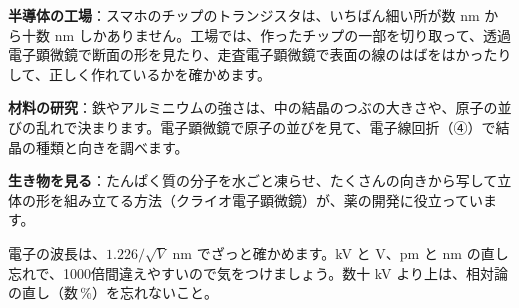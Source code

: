 \begin{phkougaku}
\textbf{半導体の工場}：スマホのチップのトランジスタは、いちばん細い所が数 nm から十数 nm しかありません。工場では、作ったチップの一部を切り取って、透過電子顕微鏡で断面の形を見たり、走査電子顕微鏡で表面の線のはばをはかったりして、正しく作れているかを確かめます。

\textbf{材料の研究}：鉄やアルミニウムの強さは、中の結晶のつぶの大きさや、原子の並びの乱れで決まります。電子顕微鏡で原子の並びを見て、電子線回折（④）で結晶の種類と向きを調べます。

\textbf{生き物を見る}：たんぱく質の分子を水ごと凍らせ、たくさんの向きから写して立体の形を組み立てる方法（クライオ電子顕微鏡）が、薬の開発に役立っています。

\begin{phketa}[電子の波の目安]
電子の波長は、$1.226/\sqrt V$ nm でざっと確かめます。kV と V、pm と nm の直し忘れで、1000倍間違えやすいので気をつけましょう。数十 kV より上は、相対論の直し（数\,\%）を忘れないこと。
\end{phketa}
\end{phkougaku}

